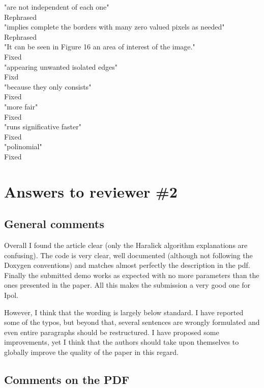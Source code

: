 \documentclass[a4paper,10pt]{report}
\begin{document}
\que "are not independent of each one"\\
\ans  Rephrased\\
\que "implies complete the borders with many zero valued pixels as needed"\\
\ans Rephrased\\
\que "It can be seen in Figure 16 an area of interest of the image."\\
\ans Fixed\\
\que "appearing unwanted isolated edges"\\
\ans Fixd\\
\que "because they only consists"\\
\ans Fixed\\
\que "more fair"\\
\ans Fixed\\

\que "runs significative faster"\\
\ans Fixed\\

\que "polinomial"\\
\ans Fixed\\

\chapter{Answers to reviewer \#2}

\section{General comments}
Overall I found the article clear (only the Haralick algorithm explanations are
confusing). The code is very clear, well documented (although not following the Doxygen conventions) and matches almost perfectly
the description in the pdf. Finally the submitted demo works as expected with no
more parameters than the ones presented in the paper. All this makes the
submission a very good one for Ipol.

However, I think that the wording is largely below standard. I have reported
some of the typos, but beyond that, several sentences are wrongly formulated and
even entire paragraphs should be restructured. I have proposed some improvements, yet
I think that the authors should take upon themselves to globally improve the
quality of the paper in this regard.

\section{Comments on the PDF}
\end{document}
